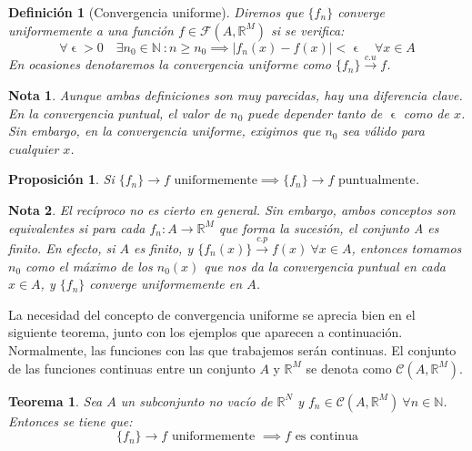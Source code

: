 \documentclass[11pt, a4paper]{article}
\newif\IfInSansMode
\let\epsilon\upvarepsilon
\providecommand{\abs}[1]{\lvert#1\rvert}
\newcommand{\R}{\mathbb{R}} \newcommand{\N}{\mathbb{N}}
\newcommand{\fn}{\{f_n\}}
\theoremstyle{theorem-style}
\newtheorem{nth}{Teorema}[section]
\newtheorem{nprop}{Proposición}[section]
\theoremstyle{definition-style}
\newtheorem{ndef}{Definición}[section]
\theoremstyle{remark-style}
\newtheorem*{nota}{Nota}
\theoremstyle{example-style}
\begin{document}
\begin{ndef}[Convergencia uniforme] Diremos que $\fn$ \textit{converge uniformemente} a una función $f \in \mathcal{F}(A,\mathbb{R}^M)$ si se verifica:
  \[
    \forall \epsilon>0 \quad \exists n_0 \in \mathbb{N}\ : n\ge n_0\implies \abs{f_n(x)-f(x)} < \epsilon \quad \forall x \in A
  \]
  En ocasiones denotaremos la convergencia uniforme como $\fn \xrightarrow {c.u} f$.
\end{ndef}


\begin{nota}
  Aunque ambas definiciones son muy parecidas, hay una diferencia clave. En la convergencia puntual, el valor de $n_0$ puede depender tanto de $\epsilon$ como de $x$. Sin embargo, en la convergencia uniforme, exigimos que $n_0$ sea válido para cualquier $x$.
\end{nota}

\begin{nprop} \label{unif_puntual}
  Si $\fn\to f \text{ uniformemente} \implies \fn \to f \text{ puntualmente}$. 
\end{nprop}

  \begin{nota}
    El recíproco no es cierto en general. Sin embargo, ambos conceptos son equivalentes si para cada $f_n : A \rightarrow \R^M$ que forma la sucesión, el conjunto A es finito. En efecto, si $A$ es finito, y $\{f_n(x)\} \xrightarrow {c.p} f(x) \ \forall x \in A$, entonces tomamos $n_0$ como el máximo de los $n_0(x)$ que nos da la convergencia puntual en cada $x \in A$, y $\fn$ converge uniformemente en $A$.
  \end{nota}	

La necesidad del concepto de convergencia uniforme se aprecia bien en el siguiente teorema, junto con los ejemplos que aparecen a continuación. Normalmente, las funciones con las que trabajemos serán continuas. El conjunto de las funciones continuas entre un conjunto $A$ y $\R^M$ se denota como $\mathcal{C}(A,\R^M)$.

\begin{nth}
  \label{2}
  Sea $A$ un subconjunto no vacío de $\R^N$ y $f_n \in \mathcal{C}(A,\R^M)\ \forall n\in \N$. Entonces se tiene que:
  \[
    \fn \to f \text{ uniformemente } \implies f \text{ es continua}
  \]
\end{nth}
\end{document}
